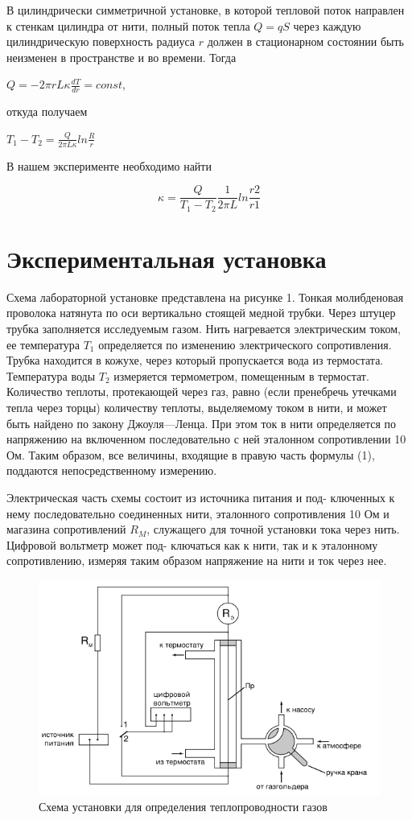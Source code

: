 \documentclass{article}
\begin{document}
В цилиндрически симметричной установке, в которой тепловой поток направлен к стенкам цилиндра от нити, полный поток тепла $Q = qS$ через каждую цилиндрическую поверхность радиуса $r$ должен в стационарном состоянии быть неизменен в пространстве и во времени. Тогда
\begin{center}
$Q = -2\pi r L \kappa \frac{dT}{dr} = const$,
\end{center}
откуда получаем
\begin{center}
$T_1 - T_2 = \frac{Q}{2\pi L \kappa} ln\frac{R}{r}$
\end{center}\par
 В нашем эксперименте необходимо найти
 \begin{center}
 \begin{equation}
 \kappa = \frac{Q}{T_1-T_2}\frac{1}{2\pi L}ln \frac{r2}{r1}
 \end{equation}
 \end{center}
 
 \section{Экспериментальная установка}
 Схема лабораторной установке представлена на рисунке 1. Тонкая молибденовая проволока натянута по оси вертикально стоящей медной трубки. Через штуцер трубка заполняется исследуемым газом. Нить нагревается электрическим током, ее температура $T_1$ определяется по изменению электрического сопротивления. Трубка находится в кожухе, через который пропускается вода из термостата. Температура воды $T_2$ измеряется термометром, помещенным в термостат. Количество теплоты,
протекающей через газ, равно (если пренебречь утечками тепла через торцы) количеству теплоты, выделяемому током в нити, и может быть найдено по закону Джоуля—Ленца. При этом ток в нити определяется по напряжению на включенном последовательно с ней эталонном сопротивлении 10 Ом. Таким образом, все величины, входящие в правую часть формулы (1), поддаются непосредственному измерению. \par
Электрическая часть схемы состоит из источника питания и под-
ключенных к нему последовательно соединенных нити, эталонного
сопротивления 10 Ом и магазина сопротивлений $R_M$, служащего для
точной установки тока через нить. Цифровой вольтметр может под-
ключаться как к нити, так и к эталонному сопротивлению, измеряя
таким образом напряжение на нити и ток через нее.

\begin{figure}[h]
    \centering
    \includegraphics[width=7.5 cm]{setup.PNG}
    \caption{Схема установки для определения теплопроводности газов}
    \label{fig:vac}
\end{figure}
\end{document}
